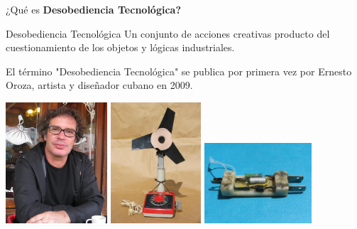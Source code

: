 \documentclass[spanish]{beamer}
\begin{document}
\begin{frame}{¿Qué es \bf{Desobediencia Tecnológica}?}
    \begin{block}{Desobediencia Tecnológica}
        Un conjunto de acciones creativas producto del cuestionamiento de los objetos y lógicas industriales.    
    \end{block}
    El término "Desobediencia Tecnológica" se publica por primera vez por Ernesto Oroza, artista y diseñador cubano en 2009.
    \vspace{0.3cm}
    
    \centering
        \includegraphics[height=4.5cm]{img/ernestooroza.jpg}
        \includegraphics[height=4.5cm]{img/inventos/ventilador.jpg}
        \includegraphics[height=3cm]{img/inventos/battery_charger.jpg}
        
\end{frame}
\end{document}
